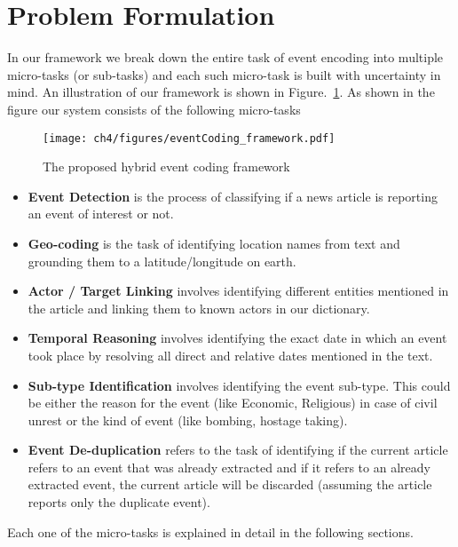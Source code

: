 \section{Problem Formulation}

In our framework we break down the entire task of event encoding into multiple micro-tasks  (or sub-tasks) and each such micro-task is built with uncertainty in mind. An illustration of our framework is shown in Figure.~\ref{fig:EventFramework}. As shown in the figure our system consists of the following micro-tasks
\begin{figure}
    \centering
    \texttt{[image: ch4/figures/eventCoding\_framework.pdf]}
    \caption{The proposed hybrid event coding framework}
    \label{fig:EventFramework}
\end{figure}

\begin{itemize}
    \item \textbf{Event Detection} is the process of classifying if a news article is reporting an event of interest or not.
    \item \textbf{Geo-coding} is the task of identifying location names from text and grounding them to a latitude/longitude on earth.  
    \item \textbf{Actor / Target Linking} involves identifying different entities mentioned in the article and linking them to known actors in our dictionary. 
    \item \textbf{Temporal Reasoning} involves identifying the exact date in which an event took place by resolving all direct and relative dates mentioned in the text.
    \item \textbf{Sub-type Identification} involves identifying the event sub-type. This could be either the reason for the event (like Economic, Religious) in case of civil unrest or the kind of event (like bombing, hostage taking).
    \item \textbf{Event De-duplication} refers to the task of identifying if the current article refers to an event that was already extracted and if it refers to an already extracted event, the current article will be discarded (assuming the article reports only the duplicate event).
\end{itemize}

Each one of the micro-tasks is explained in detail in the following sections.

